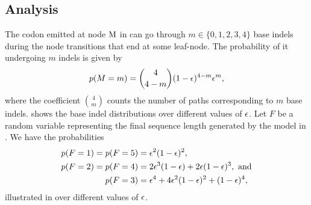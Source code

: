 \subsection{Analysis}

The codon emitted at node $\mathrm{M}$ in  can go through $m\in\{0, 1, 2, 3,
4\}$ base indels during the node transitions that end at some leaf-node. The probability of
it undergoing $m$ indels is given by
\begin{equation*}
  p(M=m) = \binom{4}{4-m} (1 - \epsilon)^{4-m} \epsilon^m,
\end{equation*}
where the coefficient $\binom{4}{m}$ counts the number of paths corresponding to $m$ base indels.
 shows the base indel distributions over different values of $\epsilon$.
Let $F$ be a random variable representing the final sequence length generated by the model in
.
We have the probabilities
\begin{equation*}
  \begin{split}
    p(F=1) = p(F=5) &= \epsilon^2(1-\epsilon)^2, \\
    p(F=2) = p(F=4) &= 2\epsilon^3(1-\epsilon) + 2\epsilon(1-\epsilon)^3,~\text{and} \\
    p(F=3)          &= \epsilon^4 + 4\epsilon^2(1-\epsilon)^2 + (1-\epsilon)^4,
  \end{split}
\end{equation*}
illustrated in  over different values of $\epsilon$.

